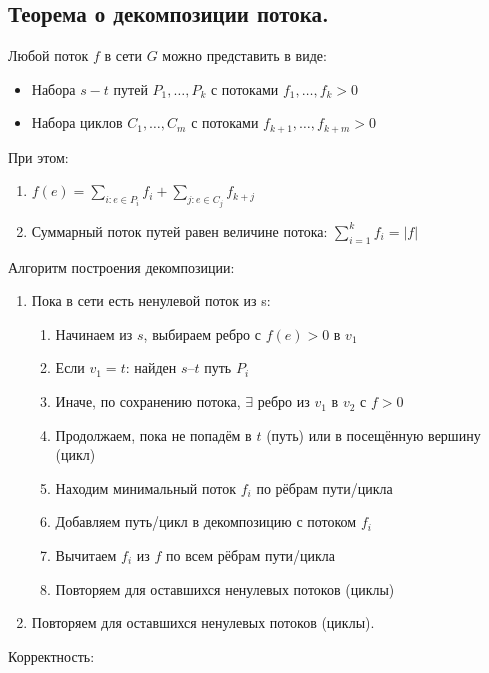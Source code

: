 \documentclass[a4paper,14pt]{article}
\begin{document}
    \subsection{Теорема о декомпозиции потока.}
    \begin{theorem}[О декомпозиции]
        Любой поток $f$ в сети $G$ можно представить в виде:
        \begin{itemize}
            \item Набора $s-t$ путей $P_1,\ldots, P_k$ с потоками $f_1,\ldots,f_k > 0$
            \item Набора циклов $C_1,\ldots,C_m$ с потоками $f_{k+1},\ldots,f_{k+m} > 0$
        \end{itemize}
        При этом:
        \begin{enumerate}
            \item $f(e)=\sum\limits_{i:e\in P_i} f_i + \sum\limits_{j: e\in C_j} f_{k+j}$
            \item Суммарный поток путей равен величине потока: $\sum\limits_{i=1}^k f_i=|f|$ 
        \end{enumerate}
    \end{theorem}
    Алгоритм построения декомпозиции:
    \begin{enumerate}
        \item Пока в сети есть ненулевой поток из s:
        \begin{enumerate}
            \item Начинаем из $s$, выбираем ребро с $f(e) > 0$ в $v_1$
            \item Если $v_1 = t$: найден $s$–$t$ путь $P_i$
            \item Иначе, по сохранению потока, $\exists$ ребро из $v_1$ в $v_2$ с $f > 0$
            \item Продолжаем, пока не попадём в $t$ (путь) или в посещённую вершину (цикл)
            \item Находим минимальный поток $f_i$ по рёбрам пути/цикла
            \item Добавляем путь/цикл в декомпозицию с потоком $f_i$
            \item Вычитаем $f_i$ из $f$ по всем рёбрам пути/цикла
            \item Повторяем для оставшихся ненулевых потоков (циклы)
          \end{enumerate}
        \item Повторяем для оставшихся ненулевых потоков (циклы).
    \end{enumerate}
    Корректность:
\end{document}
